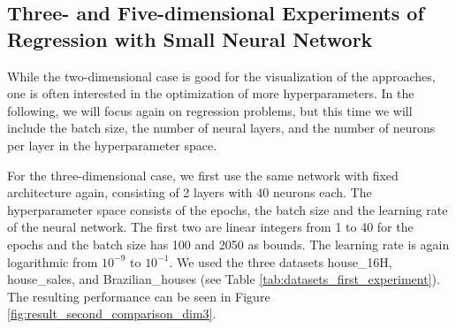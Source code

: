 \subsection{Three- and Five-dimensional Experiments of Regression with Small Neural Network}

While the two-dimensional case is good for the visualization of the approaches, one is often interested in the optimization of more hyperparameters. In the following, we will focus again on regression problems, but this time we will include the batch size, the number of neural layers, and the number of neurons per layer in the hyperparameter space. \newline 

For the three-dimensional case, we first use the same network with fixed architecture again, consisting of 2 layers with 40 neurons each. The hyperparameter space consists of the epochs, the batch size and the learning rate of the neural network. The first two are linear integers from 1 to 40 for the epochs and the batch size has 100 and 2050 as bounds. The learning rate is again logarithmic from $ 10^{-9} $ to $ 10^{-1} $. We used the three datasets house\_16H, house\_sales, and Brazilian\_houses (see Table \ref{tab:datasets_first_experiment}). The resulting performance can be seen in Figure \ref{fig:result_second_comparison_dim3}. 



